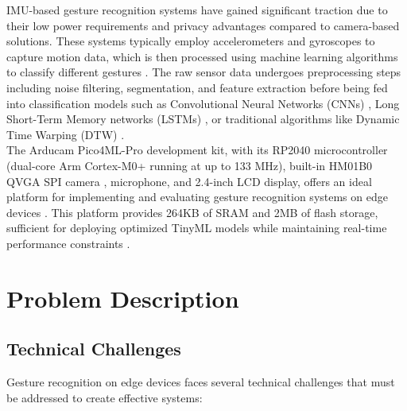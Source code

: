 IMU-based gesture recognition systems have gained significant traction due to their low power requirements and privacy advantages compared to camera-based solutions. These systems typically employ accelerometers and gyroscopes to capture motion data, which is then processed using machine learning algorithms to classify different gestures \cite{EENews:2023,Bistrov:2012}. The raw sensor data undergoes preprocessing steps including noise filtering, segmentation, and feature extraction before being fed into classification models such as Convolutional Neural Networks (CNNs) , Long Short-Term Memory networks (LSTMs)  , or traditional algorithms like Dynamic Time Warping (DTW) \cite{Kumar:2022}.\\


The Arducam Pico4ML-Pro development kit, with its RP2040  microcontroller (dual-core Arm Cortex-M0+ running at up to 133 MHz), built-in HM01B0 QVGA SPI camera \cite{Arducam:2025b}, microphone, and 2.4-inch LCD display, offers an ideal platform for implementing and evaluating gesture recognition systems on edge devices \cite{Arducam:2025c}. This platform provides 264KB of SRAM and 2MB of flash storage, sufficient for deploying optimized TinyML models while maintaining real-time performance constraints \cite{Arducam:2023}.\\

\section{Problem Description}

\subsection{Technical Challenges}
Gesture recognition on edge devices faces several technical challenges that must be addressed to create effective systems:

